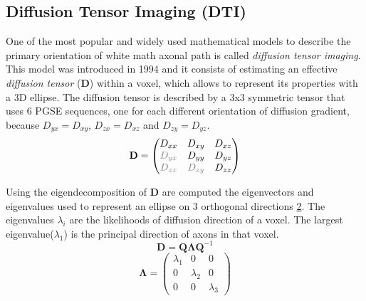  \begin{figure}[h]
    \centering
    \caption{}
    \label{fig:isotropiAnisotropi}
 \end{figure}

 \subsection{Diffusion Tensor Imaging (DTI)}
 One of the most popular and widely used mathematical models to describe the primary orientation of white math axonal path is called \emph{diffusion tensor imaging}. This model was introduced in 1994 \cite{basser1994mr} and it consists of estimating an effective \emph{diffusion tensor} ($\mathbf{D}$) within a voxel, which allows to represent its properties with a 3D ellipse. The diffusion tensor is described by a 3x3 symmetric tensor that uses 6 PGSE sequences, one for each different orientation of diffusion gradient, because $D_{yx}=D_{xy}$, $D_{zx}=D_{xz}$ and $D_{zy}=D_{yz}$.
 \begin{equation}
    \mathbf{D} = 
    \begin{pmatrix}
        D_{xx} & D_{xy} & D_{xz} \\
        \textcolor{gray}{D_{yx}} & D_{yy} & D_{yz} \\
        \textcolor{gray}{D_{zx}} & \textcolor{gray}{D_{zy}} & D_{zz}
    \end{pmatrix}
 \end{equation}

 Using the eigendecomposition of $\mathbf{D}$ are computed the eigenvectors and eigenvalues used to represent an ellipse on 3 orthogonal directions \ref{fig:elipse}. The eigenvalues $\lambda_{i}$ are the likelihoods of diffusion direction of a voxel. The largest eigenvalue($\lambda_1$) is the principal direction of axons in that voxel.
 \[\mathbf{D}=\mathbf{Q}\mathbf{\Lambda}\mathbf{Q}^{-1}\]
 \begin{equation}
    \mathbf{\Lambda} = 
    \begin{pmatrix}
        \lambda_{1} & 0 & 0 \\
        0 & \lambda_{2} & 0 \\
        0 & 0 & \lambda_{3}
    \end{pmatrix}
 \end{equation}

 \begin{figure}[h]
    \centering
    \caption{}
    \label{fig:elipse}
 \end{figure}

